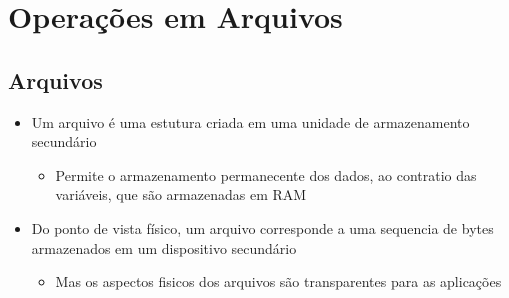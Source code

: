 \documentclass[12pt]{article}
\begin{document}
\section{Operações em Arquivos}
    \subsection{Arquivos}
    \begin{itemize}
        \item Um arquivo é uma estutura criada em uma unidade de armazenamento 
        secundário
        \begin{itemize}
            \item Permite o armazenamento permanecente dos dados, ao contratio 
            das variáveis, que são armazenadas em RAM
        \end{itemize}
        \item Do ponto de vista físico, um arquivo corresponde a uma sequencia 
        de bytes armazenados em um dispositivo secundário
        \begin{itemize}
            \item Mas os aspectos fisicos dos arquivos são transparentes para 
            as aplicações
        \end{itemize}
    \end{itemize}
\end{document}
